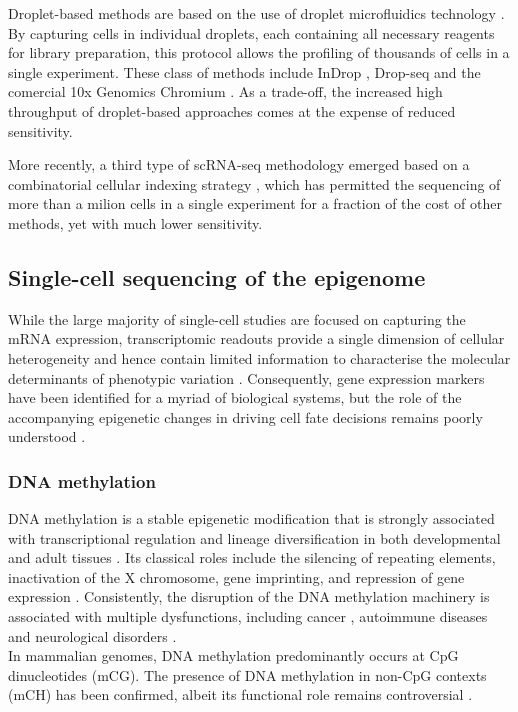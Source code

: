Droplet-based methods are based on the use of droplet microfluidics technology \cite{Zhang2019}. By capturing cells in individual droplets, each containing all necessary reagents for library preparation, this protocol allows the profiling of thousands of cells in a single experiment. These class of methods include InDrop \cite{Klein2015,Zilionis2016}, Drop-seq\cite{Macosko2015} and the comercial 10x Genomics Chromium \cite{Zheng2017}. As a trade-off, the increased high throughput of droplet-based approaches comes at the expense of reduced sensitivity\cite{Ziegenhain2017,Wang2019,Svensson2017}.

More recently, a third type of scRNA-seq methodology emerged based on a combinatorial cellular indexing strategy \cite{Cao2017,Rosenberg2018,Cao2019}, which has permitted the sequencing of more than a milion cells in a single experiment for a fraction of the cost of other methods, yet with much lower sensitivity.

\subsection{Single-cell sequencing of the epigenome}

While the large majority of single-cell studies are focused on capturing the mRNA expression, transcriptomic readouts provide a single dimension of cellular heterogeneity and hence contain limited information to characterise the molecular determinants of phenotypic variation \cite{Ritchie2015}. Consequently, gene expression markers have been identified for a myriad of biological systems, but the role of the accompanying epigenetic changes in driving cell fate decisions remains poorly understood \cite{Griffiths2018,Kelsey2017,Bheda2014}.

\subsubsection{DNA methylation} \label{section:dna_methylation}
DNA methylation is a stable epigenetic modification that is strongly associated with transcriptional regulation and lineage diversification in both developmental and adult tissues \cite{Jin2018, Harrison2011, Lee2014, Smith2013}. Its classical roles include the silencing of repeating elements, inactivation of the X chromosome, gene imprinting, and repression of gene expression \cite{Jones2012}. Consistently, the disruption of the DNA methylation machinery is associated with multiple dysfunctions, including cancer \cite{Baylin2011}, autoimmune diseases \cite{Liu2013} and neurological disorders \cite{Amir1999}.\\
In mammalian genomes, DNA methylation predominantly occurs at CpG dinucleotides (mCG). The presence of DNA methylation in non-CpG contexts (mCH) has been confirmed, albeit its functional role remains controversial \cite{He2015, Ramsahoye2000, Lister2009}.

